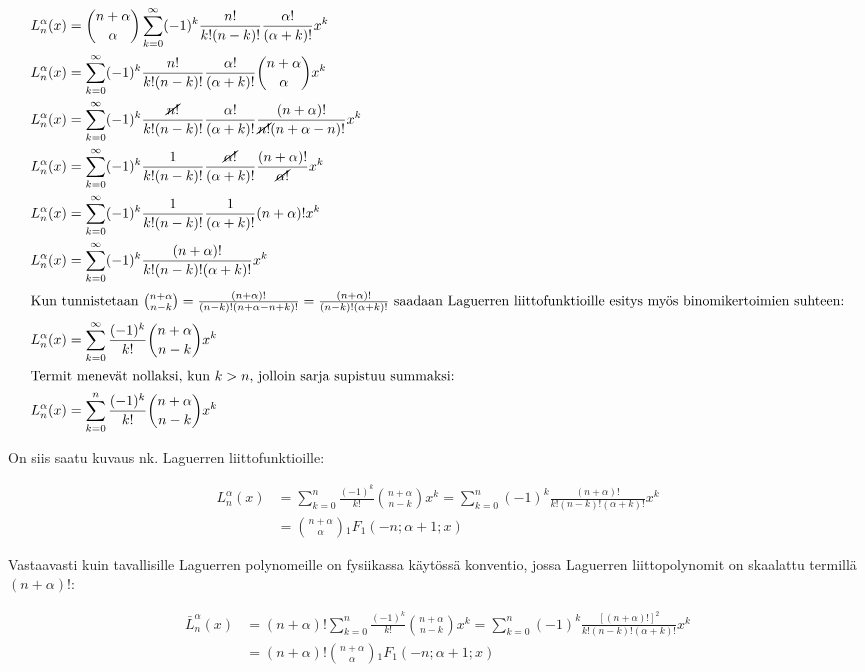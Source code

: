 \documentclass[../johdoksia.tex]{subfiles}
\begin{document}
	\begin{align}
		L_n^{\alpha}(x) &= \binom{n + \alpha}{\alpha}\sum_{k = 0}^{\infty}(-1)^k\frac{n!}{k!(n - k)!}\frac{\alpha!}{(\alpha + k)!}x^k \\
		L_n^{\alpha}(x) &= \sum_{k = 0}^{\infty}(-1)^k\frac{n!}{k!(n - k)!}\frac{\alpha!}{(\alpha + k)!}\binom{n + \alpha}{\alpha}x^k \\
		L_n^{\alpha}(x) &= \sum_{k = 0}^{\infty}(-1)^k\frac{\cancel{n!}}{k!(n - k)!}\frac{\alpha!}{(\alpha + k)!}\frac{(n + \alpha)!}{\cancel{n!}(n + \alpha - n)!}x^k \\
		L_n^{\alpha}(x) &= \sum_{k = 0}^{\infty}(-1)^k\frac{1}{k!(n - k)!}\frac{\cancel{\alpha!}}{(\alpha + k)!}\frac{(n + \alpha)!}{\cancel{\alpha!}}x^k \\
		L_n^{\alpha}(x) &= \sum_{k = 0}^{\infty}(-1)^k\frac{1}{k!(n - k)!}\frac{1}{(\alpha + k)!}(n + \alpha)!x^k \\
		L_n^{\alpha}(x) &= \sum_{k = 0}^{\infty}(-1)^k\frac{(n + \alpha)!}{k!(n - k)!(\alpha + k)!}x^k \\
		\intertext{Kun tunnistetaan $\binom{n + \alpha}{n - k} = \frac{(n + \alpha)!}{(n - k)!(n + \alpha - n + k)!} = \frac{(n + \alpha)!}{(n - k)!(\alpha + k)!}$ saadaan Laguerren liittofunktioille esitys myös binomikertoimien suhteen:}
		L_n^{\alpha}(x) &= \sum_{k = 0}^{\infty}\frac{(-1)^k}{k!}\binom{n + \alpha}{n - k}x^k \\
		\intertext{Termit menevät nollaksi, kun $k > n$, jolloin sarja supistuu summaksi:}
		L_n^{\alpha}(x) &= \sum_{k = 0}^{n}\frac{(-1)^k}{k!}\binom{n + \alpha}{n - k}x^k \\
	\end{align}

	On siis saatu kuvaus nk. Laguerren liittofunktioille:
	
	\begin{equation}
		\boxed{
		\begin{aligned}
			L_n^\alpha(x) &= \sum_{k = 0}^{n}\frac{(-1)^k}{k!}\binom{n + \alpha}{n - k}x^k = \sum_{k = 0}^{n}(-1)^k\frac{(n + \alpha)!}{k!(n - k)!(\alpha + k)!}x^k \\
			&= \binom{n + \alpha}{\alpha}{_1{F}_1}(-n; \alpha + 1; x)	
		\end{aligned}
		}
	\end{equation}

	Vastaavasti kuin tavallisille Laguerren polynomeille on fysiikassa käytössä konventio, jossa Laguerren liittopolynomit on skaalattu termillä $(n + \alpha)!$:
	
	\begin{equation}
		\boxed{
		\begin{aligned}
			\bar{L}_n^\alpha(x) &= (n + \alpha)!\sum_{k = 0}^{n}\frac{(-1)^k}{k!}\binom{n + \alpha}{n - k}x^k = \sum_{k = 0}^{n}(-1)^k\frac{[(n + \alpha)!]^2}{k!(n - k)!(\alpha + k)!}x^k \\
			 &= (n + \alpha)!\binom{n + \alpha}{\alpha}{_1{F}_1}(-n; \alpha + 1; x)
		\end{aligned}
		}
	\end{equation}
\end{document}
